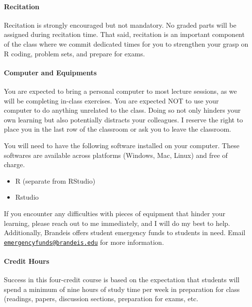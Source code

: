 \documentclass[
]{article}
\providecommand{\tightlist}{%
  \setlength{\itemsep}{0pt}\setlength{\parskip}{0pt}}
\begin{document}
\hypertarget{recitation}{%
\paragraph{Recitation}\label{recitation}}

Recitation is strongly encouraged but not mandatory. No graded parts
will be assigned during recitation time. That said, recitation is an
important component of the class where we commit dedicated times for you
to strengthen your grasp on R coding, problem sets, and prepare for
exams.

\hypertarget{computer-and-equipments}{%
\paragraph{Computer and Equipments}\label{computer-and-equipments}}

You are expected to bring a personal computer to most lecture sessions,
as we will be completing in-class exercises. You are expected NOT to use
your computer to do anything unrelated to the class. Doing so not only
hinders your own learning but also potentially distracts your
colleagues. I reserve the right to place you in the last row of the
classroom or ask you to leave the classroom.

You will need to have the following software installed on your computer.
These softwares are available across platforms (Windows, Mac, Linux) and
free of charge.

\begin{itemize}
\tightlist
\item
  R (separate from RStudio)
\item
  Rstudio
\end{itemize}

If you encounter any difficulties with pieces of equipment that hinder
your learning, please reach out to me immediately, and I will do my best
to help. Additionally, Brandeis offers student emergency funds to
students in need. Email
\href{mailto:emergencyfunds@brandeis.edu}{\nolinkurl{emergencyfunds@brandeis.edu}}
for more information.

\hypertarget{credit-hours}{%
\paragraph{Credit Hours}\label{credit-hours}}

Success in this four-credit course is based on the expectation that
students will spend a minimum of nine hours of study time per week in
preparation for class (readings, papers, discussion sections,
preparation for exams, etc.
\end{document}
